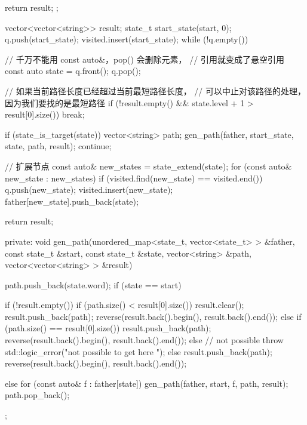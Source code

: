 \begin{Code}
{{{            return result;
        };

        vector<vector<string>> result;
        state_t start_state(start, 0);
        q.push(start_state);
        visited.insert(start_state);
        while (!q.empty()) {
            // 千万不能用 const auto&，pop() 会删除元素，
            // 引用就变成了悬空引用
            const auto state = q.front();
            q.pop();

            // 如果当前路径长度已经超过当前最短路径长度，
            // 可以中止对该路径的处理，因为我们要找的是最短路径
            if (!result.empty() && state.level + 1 > result[0].size()) break;

            if (state_is_target(state)) {
                vector<string> path;
                gen_path(father, start_state, state, path, result);
                continue;
            }

            // 扩展节点
            const auto& new_states = state_extend(state);
            for (const auto& new_state : new_states) {
                if (visited.find(new_state) == visited.end()) {
                    q.push(new_state);
                }
                visited.insert(new_state);
                father[new_state].push_back(state);
            }
        }

        return result;
    }
private:
    void gen_path(unordered_map<state_t, vector<state_t> > &father,
        const state_t &start, const state_t &state, vector<string> &path,
        vector<vector<string> > &result) {
        path.push_back(state.word);
        if (state == start) {
            if (!result.empty()) {
                if (path.size() < result[0].size()) {
                    result.clear();
                    result.push_back(path);
                    reverse(result.back().begin(), result.back().end());
                } else if (path.size() == result[0].size()) {
                    result.push_back(path);
                    reverse(result.back().begin(), result.back().end());
                } else { // not possible
                    throw std::logic_error("not possible to get here ");
                }
            } else {
                result.push_back(path);
                reverse(result.back().begin(), result.back().end());
            }

        } else {
            for (const auto& f : father[state]) {
                gen_path(father, start, f, path, result);
            }
        }
        path.pop_back();
    }
};
\end{Code}


